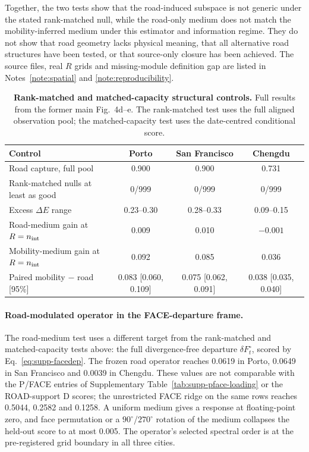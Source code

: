 Together, the two tests show that the road-induced subspace is not generic under the stated rank-matched null, while the road-only medium does not match the mobility-inferred medium under this estimator and information regime. They do not show that road geometry lacks physical meaning, that all alternative road structures have been tested, or that source-only closure has been achieved. The source files, real $R$ grids and missing-module definition gap are listed in Notes~\ref{note:spatial} and \ref{note:reproducibility}.

\begin{table}[!htbp]
\centering\small
\caption{\textbf{Rank-matched and matched-capacity structural controls.} Full results from the former main Fig.~4d--e. The rank-matched test uses the full aligned observation pool; the matched-capacity test uses the date-centred conditional score.}
\label{tab:supp-structural-controls}
\begin{tabular}{lccc}
\toprule
Control & Porto & San Francisco & Chengdu \\
\midrule
Road capture, full pool & 0.900 & 0.900 & 0.731 \\
Rank-matched nulls at least as good & 0/999 & 0/999 & 0/999 \\
Excess $\Delta E$ range & 0.23--0.30 & 0.28--0.33 & 0.09--0.15 \\
Road-medium gain at $R=n_{\rm int}$ & 0.009 & 0.010 & $-0.001$ \\
Mobility-medium gain at $R=n_{\rm int}$ & 0.092 & 0.085 & 0.036 \\
Paired mobility $-$ road [95\%] & 0.083 [0.060, 0.109] & 0.075 [0.062, 0.091] & 0.038 [0.035, 0.040] \\
\bottomrule
\end{tabular}
\end{table}

\paragraph{Road-modulated operator in the FACE-departure frame.} The road-medium test uses a different target from the rank-matched and matched-capacity tests above: the full divergence-free departure $\delta F_t^\circ$, scored by Eq.~\ref{eq:supp-facedep}. The frozen road operator reaches 0.0619 in Porto, 0.0649 in San Francisco and 0.0039 in Chengdu. These values are not comparable with the P/FACE entries of Supplementary Table~\ref{tab:supp-pface-loading} or the ROAD-support D scores; the unrestricted FACE ridge on the same rows reaches 0.5044, 0.2582 and 0.1258. A uniform medium gives a response at floating-point zero, and face permutation or a $90^\circ$/$270^\circ$ rotation of the medium collapses the held-out score to at most 0.005. The operator's selected spectral order is at the pre-registered grid boundary in all three cities.

